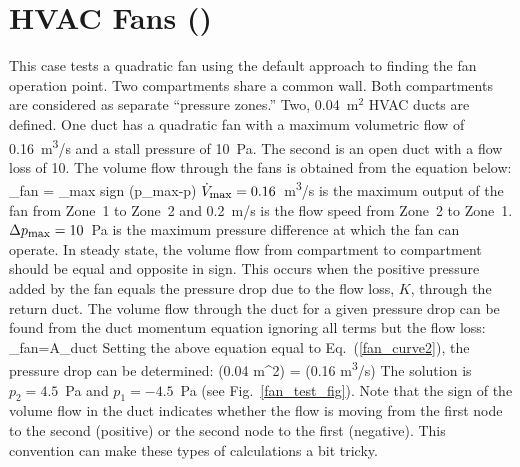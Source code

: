 \documentclass[11pt]{book}
\begin{document}
\section{HVAC Fans (\texorpdfstring{}{fan\_test})}
\label{fan_test}

This case tests a quadratic fan using the default approach to finding the fan operation point. Two compartments share a common wall. Both compartments are considered as separate ``pressure zones.'' Two, 0.04~m$^2$ HVAC ducts are defined.  One duct has a quadratic fan with a maximum volumetric flow of 0.16~\si{m^3/s} and a stall pressure of 10~Pa. The second is an open duct with a flow loss of 10. The volume flow through the fans is obtained from the equation below:
\be
   _{\hbox{\footnotesize fan}} = _{\hbox{\footnotesize max}} \; \hbox{sign} (\Delta p_{\hbox{\footnotesize max}}-\Delta p)   \label{fan_curve2}
\ee
$\dot{V}_{\hbox{\footnotesize max}}=0.16$~\si{m^3/s} is the maximum output of the fan from Zone~1 to Zone~2 and 0.2~m/s is the flow speed from Zone~2 to Zone~1. $\Delta p_{\hbox{\footnotesize max}}=10$~Pa is the maximum pressure difference at which the fan can operate. In steady state, the volume flow from compartment to compartment should be equal and opposite in sign. This occurs when the positive pressure added by the fan equals the pressure drop due to the flow loss, $K$, through the return duct.  The volume flow through the duct for a given pressure drop can be found from the duct momentum equation ignoring all terms but the flow loss:
\be
   _{\hbox{\footnotesize fan}}=A_{\hbox{\footnotesize duct}} 
\ee
Setting the above equation equal to Eq.~(\ref{fan_curve2}), the pressure drop can be determined:
\be
    (0.04 \; \hbox{m}^2) = (0.16 \; \hbox{\si{m^3/s}})  \; 
\ee
The solution is $p_2=4.5$~Pa and $p_1=-4.5$~Pa (see Fig.~\ref{fan_test_fig}). Note that the sign of the volume flow in the duct indicates whether the flow is moving from the first node to the second (positive) or the second node to the first (negative). This convention can make these types of calculations a bit tricky.
\end{document}
